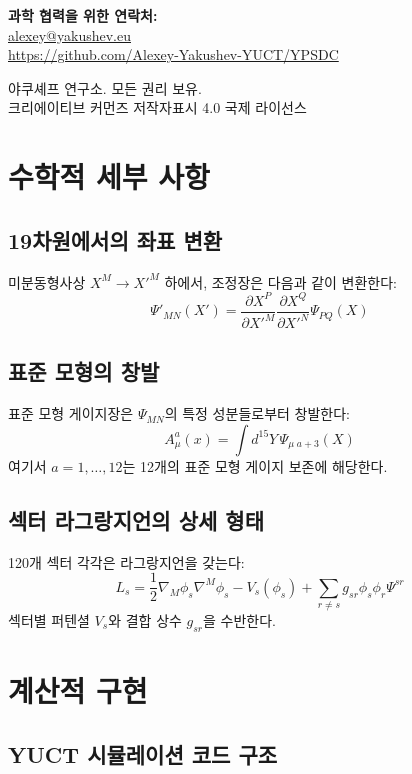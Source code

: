 \documentclass[11pt,a4paper]{article}
\theoremstyle{remark}
\begin{document}
	\begin{center}
		\vspace{1cm}
		\textbf{과학 협력을 위한 연락처:}\\
		\url{alexey@yakushev.eu}\\
		\url{https://github.com/Alexey-Yakushev-YUCT/YPSDC}
		
		\vspace{0.5cm}
		 야쿠셰프 연구소. 모든 권리 보유.\\
		크리에이티브 커먼즈 저작자표시 4.0 국제 라이선스
	\end{center}
	
	\appendix
	\section{수학적 세부 사항}
	\label{app:math-details}
	
	\subsection{19차원에서의 좌표 변환}
	
	미분동형사상 $X^M \to X'^M$ 하에서, 조정장은 다음과 같이 변환한다:
	\[
	\Psi'_{MN}(X') = \frac{\partial X^P}{\partial X'^M} \frac{\partial X^Q}{\partial X'^N} \Psi_{PQ}(X)
	\]
	
	\subsection{표준 모형의 창발}
	
	표준 모형 게이지장은 $\Psi_{MN}$의 특정 성분들로부터 창발한다:
	\[
	A_\mu^a(x) = \int d^{15}Y \, \Psi_{\mu\;a+3}(X)
	\]
	여기서 $a=1,\dots,12$는 12개의 표준 모형 게이지 보존에 해당한다.
	
	\subsection{섹터 라그랑지언의 상세 형태}
	
	120개 섹터 각각은 라그랑지언을 갖는다:
	\[
	L_s = \frac{1}{2} \nabla_M \phi_s \nabla^M \phi_s - V_s(\phi_s) + \sum_{r \neq s} g_{sr} \phi_s \phi_r \Psi^{sr}
	\]
	섹터별 퍼텐셜 $V_s$와 결합 상수 $g_{sr}$을 수반한다.
	
	\section{계산적 구현}
	\label{app:computational}
	
	\subsection{YUCT 시뮬레이션 코드 구조}
	
\end{document}
